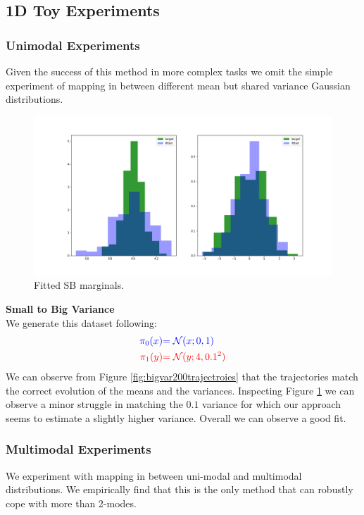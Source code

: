 \documentclass[a4paper,12pt,twoside,openright]{report}
\theoremstyle{definition}
\begin{document}
\subsection{1D Toy Experiments }
\subsubsection{Unimodal Experiments}
Given the success of this method in more complex tasks we omit the simple experiment of mapping in between different mean but shared variance Gaussian distributions.
\begin{figure}
    \centering
    \includegraphics[scale=0.3,trim={2.3cm 1cm 2.5cm 0}, clip]{images/GP/gp_bigvar_boundaires.png}
    \caption{ Fitted SB marginals.  }
    \label{fig:bigvar200boundaries}
\end{figure}
\textbf{Small to Big Variance}\\
We generate this dataset following:
\begin{align*}
\color{blue}{\pi_0(x)} &\color{blue}{= {\mathcal{N}}(x; 0,  1)} \\
    \color{red}{\pi_1(y)} &\color{red}{= {\mathcal{N}}(y; 4, 0.1^2)} 
\end{align*}
We can observe from Figure \ref{fig:bigvar200trajectroies} that the trajectories match the correct evolution of the means and the variances. Inspecting Figure \ref{fig:bigvar200boundaries} we can observe a minor struggle in matching the $0.1$ variance for which our approach seems to estimate a slightly higher variance. Overall we can observe a good fit.

\subsubsection{Multimodal Experiments}

We experiment with mapping in between uni-modal and multimodal distributions. We empirically find that this is the only method that can robustly cope with more than 2-modes.
\end{document}
